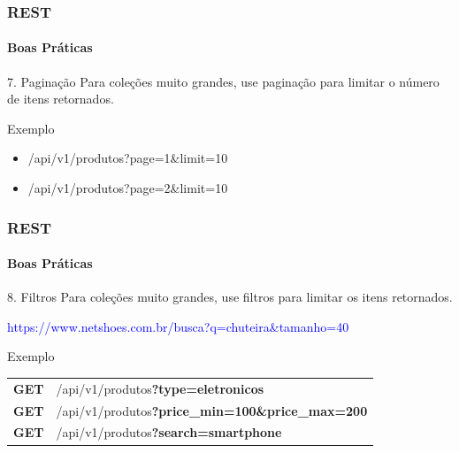 \documentclass[
	9pt, %
	t, %
]{beamer}
\newcommand{\yellowbox}[1]{\colorbox{yellow!75}{#1}}
\begin{document}
\begin{frame}
	\frametitle{REST}
	\framesubtitle{Boas Práticas}

	\begin{block}{7. Paginação}
		Para coleções muito grandes, use paginação para limitar o número de itens retornados. 
	\end{block}

	\begin{exampleblock}{Exemplo}
		\begin{itemize}
			\item /api/v1/produtos\yellowbox{?page=1\&limit=10}
			\item /api/v1/produtos\yellowbox{?page=2\&limit=10}
		\end{itemize}
	\end{exampleblock}

\end{frame}

\begin{frame}
	\frametitle{REST}
	\framesubtitle{Boas Práticas}

	\begin{block}{8. Filtros}
		Para coleções muito grandes, use filtros para limitar os itens retornados. \\ \bigskip

		\textcolor{blue}{https://www.netshoes.com.br\yellowbox{/busca?q=chuteira\&tamanho=40}}
	\end{block}

	\begin{exampleblock}{Exemplo}
		\begin{tabular}{@{}ll@{}}
			\textbf{GET}    &  \yellowbox{/api/v1/produtos\textbf{?type=eletronicos}} \\
			\textbf{GET}    &  \yellowbox{/api/v1/produtos\textbf{?price\_min=100\&price\_max=200}} \\
			\textbf{GET}    &  \yellowbox{/api/v1/produtos\textbf{?search=smartphone}} \\
		\end{tabular}
	\end{exampleblock}

\end{frame}
\end{document}
